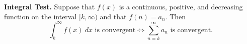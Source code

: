 \begin{tcolorbox}
\textbf{Integral Test.}\newline
Suppose that $f(x)$ is a continuous, positive, and decreasing function on the interval $[k,\infty)$ and that $f(n)=a_n$. Then
$$\int_k^\infty f(x)\ dx\text{ is convergent} \iff \sum_{n=k}^\infty a_n\text{ is convergent}.$$
\end{tcolorbox}
